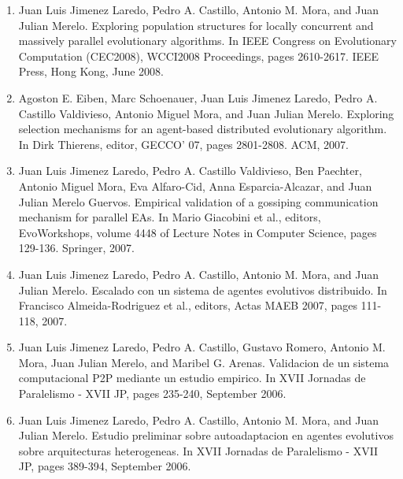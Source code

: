 \begin{description}
\begin{enumerate}
\item Juan Luis Jimenez Laredo, Pedro A. Castillo, Antonio M. Mora, and Juan Julian Merelo. Exploring  population structures for locally concurrent and massively parallel evolutionary algorithms. In IEEE Congress on Evolutionary Computation (CEC2008), WCCI2008 Proceedings, pages 2610-2617. IEEE Press, Hong Kong, June 2008.


\item Agoston E. Eiben, Marc Schoenauer, Juan Luis Jimenez Laredo, Pedro A. Castillo Valdivieso, Antonio Miguel Mora, and Juan Julian Merelo. Exploring selection mechanisms for an agent-based distributed evolutionary algorithm. In Dirk Thierens, editor, GECCO' 07, pages 2801-2808. ACM, 2007.

     
\item Juan Luis Jimenez Laredo, Pedro A. Castillo Valdivieso, Ben Paechter, Antonio Miguel Mora, Eva Alfaro-Cid, Anna Esparcia-Alcazar, and  Juan Julian Merelo Guervos. Empirical validation of a gossiping communication mechanism for parallel EAs. In Mario Giacobini et al., editors, EvoWorkshops, volume 4448 of Lecture Notes in Computer Science, pages 129-136. Springer, 2007.

\item Juan Luis Jimenez Laredo, Pedro A. Castillo, Antonio M. Mora, and Juan Julian Merelo. Escalado con un sistema de agentes evolutivos distribuido. In Francisco Almeida-Rodriguez et al., editors, Actas MAEB 2007, pages 111-118, 2007.
    
\item Juan Luis Jimenez Laredo, Pedro A. Castillo, Gustavo Romero, Antonio M. Mora, Juan Julian Merelo, and
    Maribel G. Arenas. Validacion de un sistema computacional P2P mediante un estudio empirico. In XVII Jornadas de Paralelismo - XVII JP, pages 235-240, September 2006.
    
\item Juan Luis Jimenez Laredo, Pedro A. Castillo, Antonio M. Mora, and Juan Julian Merelo. Estudio preliminar sobre autoadaptacion en agentes evolutivos sobre arquitecturas heterogeneas. In XVII Jornadas de Paralelismo - XVII JP, pages 389-394, September 2006.

\end{enumerate}
\end{description}



